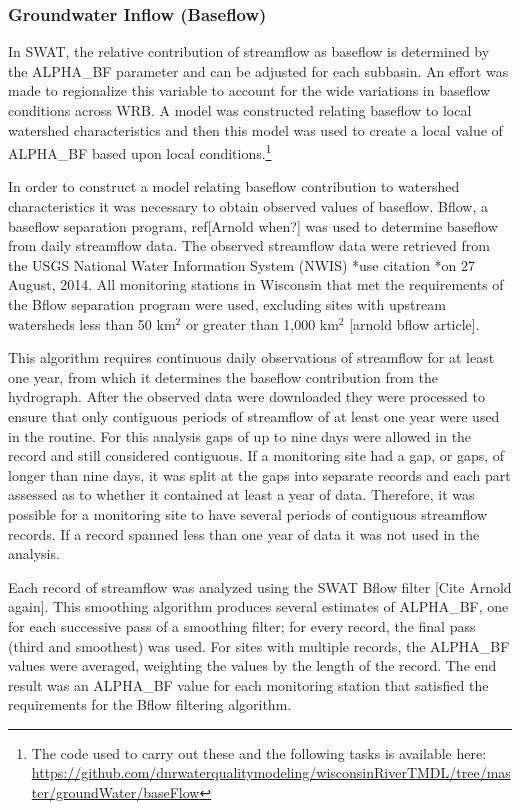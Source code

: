 \subsubsection{Groundwater Inflow (Baseflow)}
	In SWAT, the relative contribution of streamflow as baseflow is determined by the ALPHA\_BF parameter and can be adjusted for each subbasin. An effort was made to regionalize this variable to account for the wide variations in baseflow conditions across WRB. A model was constructed relating baseflow to local watershed characteristics and then this model was used to create a local value of ALPHA\_BF based upon local conditions.\footnote{The code used to carry out these and the following tasks is available here: \url{https://github.com/dnrwaterqualitymodeling/wisconsinRiverTMDL/tree/master/groundWater/baseFlow}}
	
	In order to construct a model relating baseflow contribution to watershed characteristics it was necessary to obtain observed values of baseflow. Bflow, a baseflow separation program, ref[Arnold when?] was used to determine baseflow from daily streamflow data. The observed streamflow data were retrieved from the USGS National Water Information System (NWIS) *use citation *on 27 August, 2014. All monitoring stations in Wisconsin that met the requirements of the Bflow separation program were used, excluding sites with upstream watersheds less than 50 km$^2$ or greater than 1,000 km$^2$ [arnold bflow article].
	
	This algorithm requires continuous daily observations of streamflow for at least one year, from which it determines the baseflow contribution from the hydrograph.	After the observed data were downloaded they were processed to ensure that only contiguous periods of streamflow of at least one year were used in the routine. For this analysis gaps of up to nine days were allowed in the record and still considered contiguous. If a monitoring site had a gap, or gaps, of longer than nine days, it was split at the gaps into separate records and each part assessed as to whether it contained at least a year of data. Therefore, it was possible for a monitoring site to have several periods of contiguous streamflow records. If a record spanned less than one year of data it was not used in the analysis.
	
	Each record of streamflow was analyzed using the SWAT Bflow filter [Cite Arnold again]. This smoothing algorithm produces several estimates of ALPHA\_BF, one for each successive pass of a smoothing filter; for every record, the final pass (third and smoothest) was used. For sites with multiple records, the ALPHA\_BF values were averaged, weighting the values by the length of the record. The end result was an ALPHA\_BF value for each monitoring station that satisfied the requirements for the Bflow filtering algorithm.  

